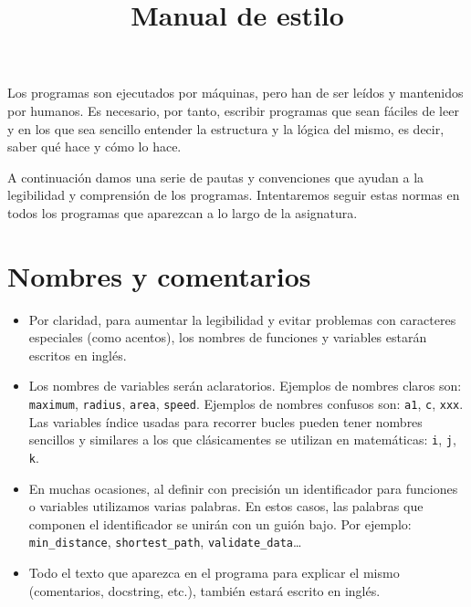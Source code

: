\documentclass{article}
\title{Manual de estilo}
\newcommand{\code}[1]{\lstinline{#1}}
\begin{document}
\maketitle

Los programas son ejecutados por máquinas, pero han de
ser leídos y mantenidos por humanos. Es necesario, por tanto, escribir
programas que sean fáciles de leer y en los que sea sencillo entender
la estructura y la lógica del mismo, es decir, saber qué hace y cómo lo hace.

A continuación damos una serie de pautas y convenciones que ayudan a la legibilidad y comprensión de los programas. Intentaremos seguir estas normas en todos los programas que aparezcan a lo largo de la asignatura.

\section{Nombres y comentarios}
\begin{itemize}
\item Por claridad, para aumentar la legibilidad y evitar problemas con caracteres especiales (como acentos), los nombres de funciones y variables estarán escritos en inglés.
\item Los nombres de variables serán aclaratorios. Ejemplos de nombres claros son: \code{maximum}, \code{radius}, \code{area}, \code{speed}. Ejemplos de nombres confusos son: \code{a1}, \code{c}, \code{xxx}. Las variables índice usadas para recorrer bucles pueden tener nombres sencillos y similares a los que clásicamentes se utilizan en matemáticas: \code{i}, \code{j}, \code{k}.
\item En muchas ocasiones, al definir con precisión un identificador para funciones o variables utilizamos varias palabras. En  estos casos, las palabras que componen el identificador se unirán con un guión bajo. Por ejemplo: \code{min_distance}, \code{shortest_path}, \code{validate_data}\ldots
\item Todo el texto que aparezca en el programa para explicar el mismo (comentarios, docstring, etc.), también estará escrito en inglés.
\end{itemize}
\end{document}
